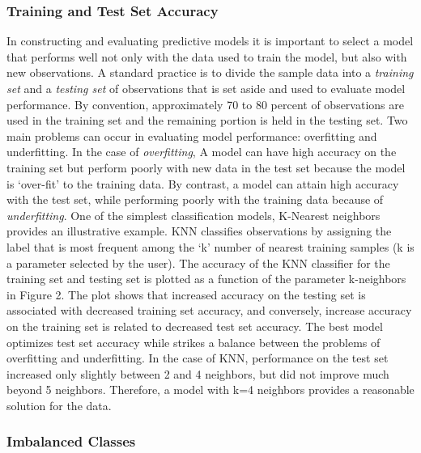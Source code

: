 \documentclass[sigconf]{acmart}
\begin{document}

\subsubsection{Training and Test Set Accuracy}

In constructing and evaluating predictive models it is important to select 
a model that performs well not only with the data used to train the model, 
but also with new observations. A standard practice is to divide the sample 
data into a \emph{training set} and a \emph{testing set} of observations that 
is set aside and used to evaluate model performance. By convention, approximately 
70 to 80 percent of observations are used in the training set and the remaining 
portion is held in the testing set. Two main problems can occur in evaluating 
model performance: overfitting and underfitting. In the case of 
\emph{overfitting}, A model can have high accuracy on the training set 
but perform poorly with new data in the test set because the model is 
`over-fit' to the training data. By contrast, a model can attain high 
accuracy with the test set, while performing poorly with the training data 
because of \emph{underfitting}. One of the simplest classification models, 
K-Nearest neighbors provides an illustrative example. KNN classifies 
observations by assigning the label that is most frequent among the `k' 
number of nearest training samples (k is a parameter selected by the user). 
The accuracy of the KNN classifier for the training set and testing set is 
plotted as a function of the parameter k-neighbors in Figure 2. The plot 
shows that increased accuracy on the testing set is associated with 
decreased training set accuracy, and conversely, increase accuracy on 
the training set is related to decreased test set accuracy. The best model 
optimizes test set accuracy while strikes a balance between the problems of 
overfitting and underfitting. In the case of KNN, performance on the test set 
increased only slightly between 2 and 4 neighbors, but did not improve much 
beyond 5 neighbors. Therefore, a model with k=4 neighbors provides a 
reasonable solution for the data. 

\subsubsection{Imbalanced Classes}
\end{document}
